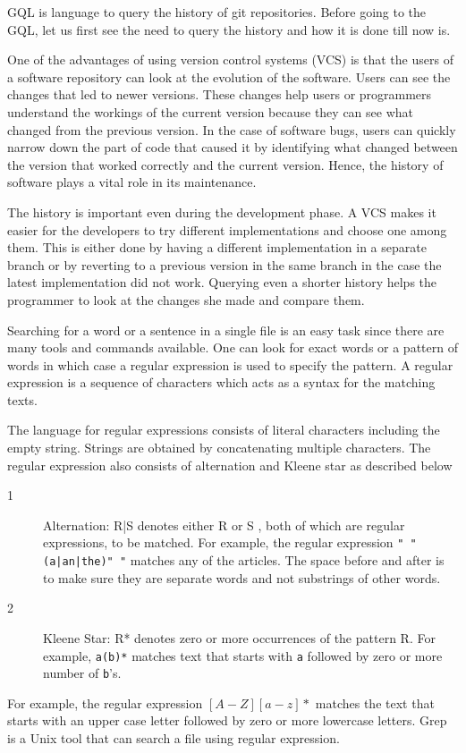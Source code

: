 
GQL is language to query the history of git repositories. Before going to the GQL, let us first see the need to query the history and how it is done till now is.


One of the advantages of using version control systems (VCS) is that the users of a software repository can look at the evolution of the software. Users can see the changes that led to newer versions. These changes help users or programmers understand the workings of the current version because they can see what changed from the previous version. In the case of software bugs, users can quickly narrow down the part of code that caused it by identifying what changed between the version that worked correctly and the current version. Hence, the history of software plays a vital role in its maintenance. 


The history is important even during the development phase. A VCS makes it easier for the developers to try different implementations and choose one among them. This is either done by having a different implementation in a separate branch or by reverting to a previous version in the same branch in the case the latest implementation did not work. Querying even a shorter history helps the programmer to look at the changes she made and compare them.


Searching for a word or a sentence in a single file is an easy task since there are many tools and commands available. One can look for exact words or a pattern of words in which case a regular expression is used to specify the pattern. A regular expression is a sequence of characters which acts as a syntax for the matching texts. 

The language for regular expressions consists of literal characters including the empty string. Strings are obtained by concatenating multiple characters. The regular expression also consists of alternation and Kleene star as described below
\begin{description}
\item[1]Alternation: R|S denotes either R or S , both of which are regular expressions, to be matched. For example, the regular expression \texttt{" "(a|an|the)" "} matches any of the articles. The space before and after is to make sure they are separate words and not substrings of other words.
\item[2]Kleene Star: R* denotes zero or more occurrences of the pattern R. For example, \texttt{a(b)*} matches text that starts with \texttt{a} followed by zero or more number of \texttt{b}'s.
\end{description} 
For example, the regular expression $[A-Z][a-z]*$ matches the text that starts with an upper case letter followed by zero or more lowercase letters. %
Grep is a Unix tool that can search a file using regular expression. 



